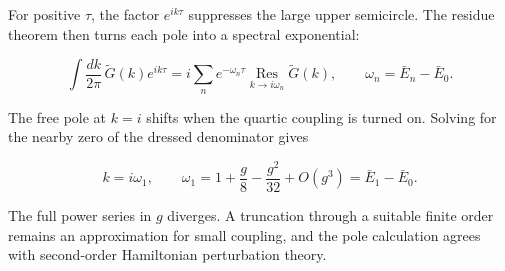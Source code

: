 For positive $\tau$, the factor $e^{ik\tau}$ suppresses the large upper
semicircle. The residue theorem then turns each pole into a spectral
exponential:

\begin{equation}
 \int\frac{dk}{2\pi}\,\widetilde G(k)e^{ik\tau}
 =i\sum_n e^{-\omega_n\tau}
 \underset{k\to i\omega_n}{\operatorname{Res}}\widetilde G(k),
 \qquad
 \omega_n=\bar E_n-\bar E_0.
 \label{eq:253a-pole-spectral-map}
\end{equation}

The free pole at $k=i$ shifts when the quartic coupling is turned on. Solving
for the nearby zero of the dressed denominator gives

\begin{equation}
 k=i\omega_1,
 \qquad
 \omega_1=1+\frac{g}{8}-\frac{g^2}{32}+O(g^3)
 =\bar E_1-\bar E_0.
 \label{eq:253a-first-interacting-gap}
\end{equation}

The full power series in $g$ diverges. A truncation through a suitable finite
order remains an approximation for small coupling, and the pole calculation
agrees with second-order Hamiltonian perturbation theory.

